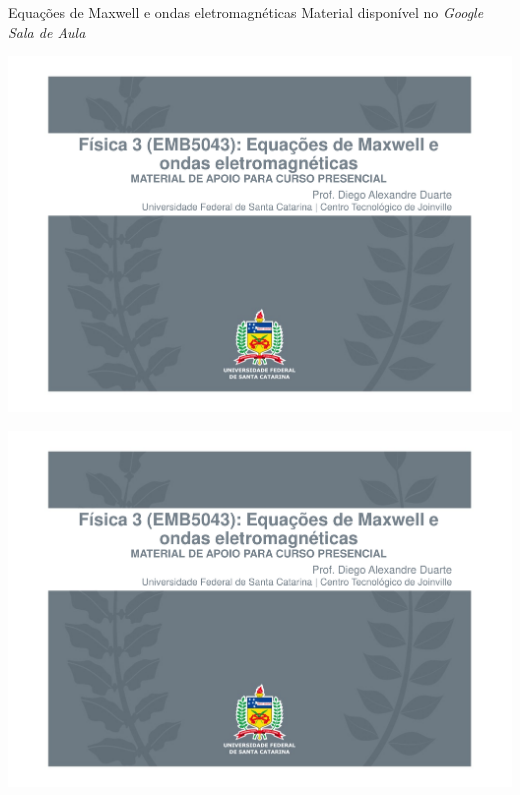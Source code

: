 \begin{frame}{Equações de Maxwell e ondas eletromagnéticas}
    Material disponível no \textit{Google Sala de Aula}

    \centering
    \includegraphics[page=1,height=0.75\textheight]{images/Equações-de-Maxwell.pdf}
\end{frame}

\begin{frame}
    \centering
    \includegraphics[height=0.95\textheight, page=12]{images/Equações-de-Maxwell.pdf}
\end{frame}

